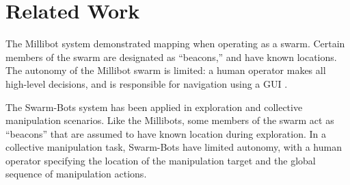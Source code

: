 \documentclass[journal]{IEEEtran}
\begin{document}

\section{Related Work}\label{sec:related-work}
%
%

The Millibot system demonstrated mapping when operating as a swarm. Certain members of the swarm are designated as ``beacons,'' and have known locations. The autonomy of the Millibot swarm is limited: a human operator makes all high-level decisions, and is responsible for navigation using a GUI \cite{Grabowski2000}.

The Swarm-Bots system has been applied in exploration \cite{Dorigo2005} and collective manipulation \cite{Mondada2005} scenarios.  Like the Millibots, some members of the swarm act as ``beacons'' that are assumed to have known location during exploration.  In a collective manipulation task, Swarm-Bots have limited autonomy, with a human operator specifying the location of the manipulation target and the global sequence of manipulation actions.
\end{document}
